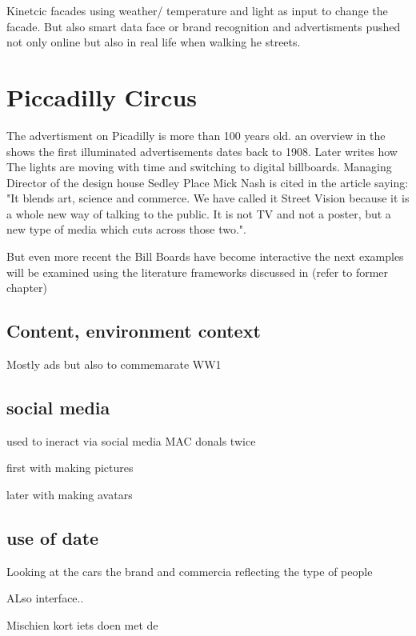 \documentclass[a4paper, 11pt]{article}
\begin{document}
Kinetcic facades using weather/ temperature and light as input to change the facade.
But also smart data face or brand recognition and advertisments pushed not only online but also in real life when walking he streets.


\section{Piccadilly Circus}

The advertisment on Picadilly is more than 100 years old. an overview in the \cite{telegraph2011} shows the first illuminated advertisements dates back to 1908. Later \cite{nelson_1998} writes how The lights are moving with time and switching to digital billboards. Managing Director of the design house Sedley Place Mick Nash is cited in the article saying: "It blends art, science and commerce. We have called it Street Vision because it is a whole new way of talking to the public. It is not TV and not a poster, but a new type of media which cuts across those two."\cite{nelson1998}.

But even more recent the Bill Boards have become interactive the next examples will be examined using the literature frameworks discussed in (refer to former chapter) 

\subsection{Content, environment context}

Mostly ads but also to commemarate WW1


\subsection{social media}

used to ineract via social media MAC donals twice


first with making pictures


later with making avatars


\subsection{use of date}


Looking at the cars the brand and commercia reflecting the type of people

ALso interface..

Mischien kort iets doen met de 
\end{document}
